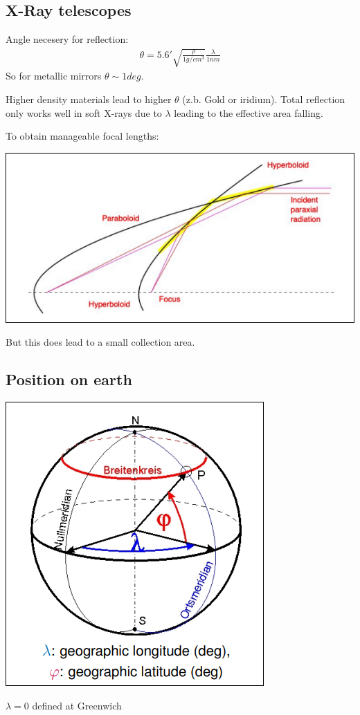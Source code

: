 \documentclass[11pt,a4paper]{article}
\begin{document}
\subsection{X-Ray telescopes}
Angle necesery for reflection: 
\begin{align*}
    \theta = 5.6' \sqrt{\frac{\rho}{1 g/cm^3}} \frac \lambda {1nm} 
\end{align*}
So for metallic mirrors $\theta \sim 1deg$.

Higher density materials lead to higher $\theta$ (z.b. Gold or iridium).
Total reflection only works well in soft X-rays due to $\lambda$ leading to the effective area falling.

To obtain manageable focal lengths:
\begin{center}
    \includegraphics[width=0.6\linewidth]{screenshot_2024-01-13-200712.png}
\end{center}
But this does lead to a small collection area.
\subsection{Position on earth}
\begin{center}
    \includegraphics[width=0.6\linewidth]{screenshot_2024-01-13-200901.png}
\end{center}
$\lambda = 0$ defined at Greenwich
\end{document}

